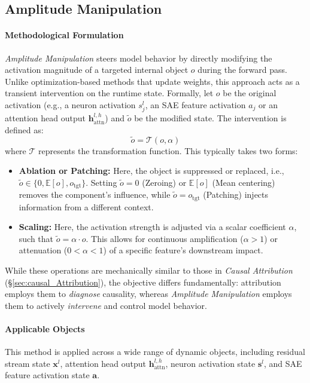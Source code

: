 \documentclass[11pt,letterpaper]{mystyle}
\begin{document}
\subsection{Amplitude Manipulation}
\label{sec:amplitude_manipulation}
\paragraph{Methodological Formulation}
\textit{Amplitude Manipulation} steers model behavior by directly modifying the activation magnitude of a targeted internal object $o$ during the forward pass. Unlike optimization-based methods that update weights, this approach acts as a transient intervention on the runtime state.
Formally, let $o$ be the original activation (e.g., a neuron activation $s^l_j$, an SAE feature activation $a_j$ or an attention head output $\mathbf{h}^{l,h}_{\text{attn}}$) and $\tilde{o}$ be the modified state. The intervention is defined as:
\begin{equation}
\tilde{o} = \mathcal{T}(o, \alpha)
\end{equation}
where $\mathcal{T}$ represents the transformation function. This typically takes two forms:
\begin{itemize}
    \item \textbf{Ablation or Patching:} Here, the object is suppressed or replaced, i.e., $\tilde{o} \in \{0, \mathbb{E}[o], o_{\text{tgt}}\}$. Setting $\tilde{o} = 0$ (Zeroing) or $\mathbb{E}[o]$ (Mean centering) removes the component's influence, while $\tilde{o} = o_{\text{tgt}}$ (Patching) injects information from a different context.
    \item \textbf{Scaling:} Here, the activation strength is adjusted via a scalar coefficient $\alpha$, such that $\tilde{o} = \alpha \cdot o$. This allows for continuous amplification ($\alpha > 1$) or attenuation ($0 < \alpha < 1$) of a specific feature's downstream impact.
\end{itemize}
While these operations are mechanically similar to those in \textit{Causal Attribution} (\S\ref{sec:causal_Attribution}), the objective differs fundamentally: attribution employs them to \textit{diagnose} causality, whereas \textit{Amplitude Manipulation} employs them to actively \textit{intervene} and control model behavior.



\paragraph{Applicable Objects}
This method is applied across a wide range of dynamic objects, including residual stream state $\mathbf{x}^l$, attention head output $\mathbf{h}_{\text{attn}}^{l,h}$, neuron activation state $\mathbf{s}^l$, and SAE feature activation state $\mathbf{a}$.
\end{document}

